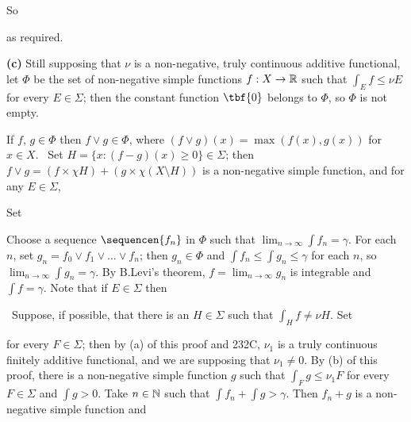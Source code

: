{

\noindent So


\noindent as required.\ \Qed

\medskip

{\bf (c)} Still supposing that $\nu$ is a non-negative, truly continuous
additive functional,   let $\Phi$ be the set of non-negative
simple functions $f:X\to\Bbb R$ such that
$\int_Ef\le\nu E$ for every $E\in\Sigma$;  then
the constant function $\tbf{0}$ belongs to $\Phi$, so $\Phi$ is not
empty.

If $f$, $g\in\Phi$ then $f\vee g\in\Phi$, where $(f\vee
g)(x)=\max(f(x),g(x))$ for $x\in X$.   \Prf\    Set
$H=\{x:(f-g)(x)\ge 0\}\in\Sigma$;   then $f\vee g=(f\times\chi
H)+(g\times\chi(X\setminus H))$ is a non-negative simple function, and
for any $E\in\Sigma$,


Set


\noindent    Choose a
sequence $\sequencen{f_n}$ in $\Phi$  such that $\lim_{n\to\infty}\int
f_n=\gamma$.   For each $n$, set $g_n=f_0\vee f_1\vee\ldots\vee f_n$;
then $g_n\in\Phi$ and $\int f_n\le\int g_n\le\gamma$ for each $n$, so
$\lim_{n\to\infty}\int g_n=\gamma$.   By B.Levi's theorem,
$f=\lim_{n\to\infty}g_n$ is integrable and $\int f=\gamma$.   Note that
if $E\in\Sigma$ then



\vthsp\Quer\ Suppose, if possible, that there is an $H\in\Sigma$ such
that $\int_Hf\ne\nu H$.   Set


\noindent for every
$F\in\Sigma$;  then by (a) of this proof and 232C, $\nu_1$ is a truly
continuous finitely additive functional, and we are supposing that
$\nu_1\ne 0$.   By (b) of this proof, there
is a non-negative simple function $g$ such that $\int_Fg\le\nu_1F$ for
every $F\in\Sigma$ and $\int g>0$.   Take $n\in\Bbb N$ such that
$\int f_n+\int g>\gamma$.   Then $f_n+g$ is a non-negative simple
function and


}
